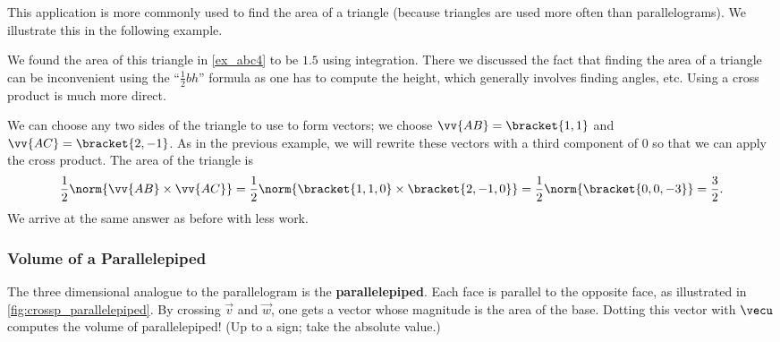 This application is more commonly used to find the area of a triangle (because triangles are used more often than parallelograms). We illustrate this in the following example.

{We found the area of this triangle in \autoref{ex_abc4} to be $1.5$ using integration. There we discussed the fact that finding the area of a triangle can be inconvenient using the ``$\frac12bh$'' formula as one has to compute the height, which generally involves finding angles, etc. Using a cross product is much more direct.


We can choose any two sides of the triangle to use to form vectors; we choose $\vv{AB} = \bracket{1,1}$ and $\vv{AC}=\bracket{2,-1}$. As in the previous example, we will rewrite these vectors with a third component of 0 so that we can apply the cross product. The area of the triangle is
\[
\frac12\norm{\vv{AB}\times\vv{AC}}
= \frac12\norm{\bracket{1,1,0}\times \bracket{2,-1,0}}
= \frac12\norm{\bracket{0,0,-3}} = \frac32.
\]
We arrive at the same answer as before with less work.}

\subsubsection*{Volume of a Parallelepiped}

The three dimensional analogue to the parallelogram is the \textbf{parallelepiped}.
%
%
%
%
%
%
%
Each face is parallel to the opposite face, as illustrated in \autoref{fig:crossp_parallelepiped}. By crossing $\vec v$ and $\vec w$, one gets a vector whose magnitude is the area of the base. Dotting this vector with $\vecu$ computes the volume of parallelepiped! (Up to a sign; take the absolute value.)

